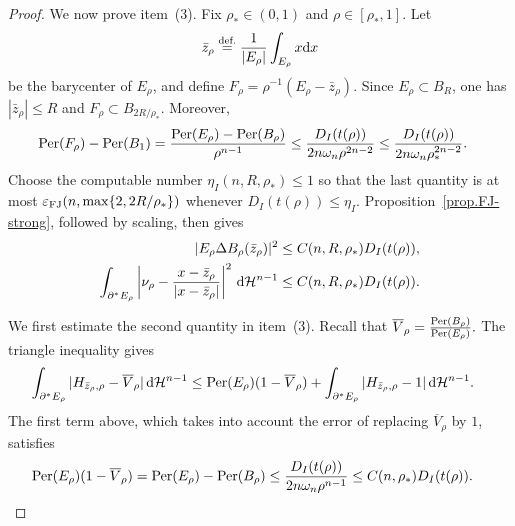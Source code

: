\documentclass[11pt]{amsart}
\theoremstyle{plain}
\theoremstyle{definition}
\newcommand{\dHn}{\,\dd\mathcal{H}^{n-1}}
\newcommand{\eqdef}{\overset{\text{def.}}{=}}
\def\dd{{\rm d}}
\newcommand\Per{\mathop{\rm Per}}
\begin{document}
\begin{proof}
We now prove item~(3). Fix $\rho_*\in(0,1)$ and
$\rho\in[\rho_*,1]$. Let
\[
 \bar z_\rho\eqdef\frac{1}{|E_\rho|}\int_{E_\rho}x\dd x
\]
be the barycenter of $E_\rho$, and define
$F_\rho=\rho^{-1}(E_\rho-\bar z_\rho)$. Since
$E_\rho\subset B_R$, one has $|\bar z_\rho|\le R$ and
$F_\rho\subset B_{2R/\rho_*}$. Moreover,
\begin{align}\label{eq.normalized_perimeter_deficit}
 \Per(F_\rho)-\Per(B_1)
 &=\frac{\Per(E_\rho)-\Per(B_\rho)}{\rho^{n-1}}
  \le\frac{D_I(t(\rho))}{2n\omega_n\rho^{2n-2}}
 \le\frac{D_I(t(\rho))}{2n\omega_n\rho_*^{2n-2}}.
\end{align}
Choose the computable number $\eta_I(n,R,\rho_*)\le1$ so that the last
quantity is at most
$\varepsilon_{\rm FJ}(n,\max\{2,2R/\rho_*\})$ whenever
$D_I(t(\rho))\le\eta_I$. Proposition~\ref{prop.FJ-strong}, followed by
scaling, then gives
\begin{align}
 |E_\rho\Delta B_\rho(\bar z_\rho)|^2
 &\le C(n,R,\rho_*)D_I(t(\rho)),
 \label{eq.local_FJ_volume}\\
 \int_{\partial^*E_\rho}
 \left|\nu_\rho-\frac{x-\bar z_\rho}{|x-\bar z_\rho|}\right|^2\dHn
 &\le C(n,R,\rho_*)D_I(t(\rho)).
 \label{eq.local_FJ_normal}
\end{align}

We first estimate the second quantity in item~(3). Recall that
$
 \overline V_\rho=\frac{\Per(B_\rho)}{\Per(E_\rho)}.
$
The triangle inequality gives
\begin{align*}
 \int_{\partial^*E_\rho}
 |H_{\bar z_\rho,\rho}-\overline V_\rho|\dHn
 &\le \Per(E_\rho)(1-\overline V_\rho)
 +\int_{\partial^*E_\rho}|H_{\bar z_\rho,\rho}-1|\dHn.
\end{align*}
The first term above, which takes into account the error of replacing
$\overline V_\rho$ by $1$, satisfies
\begin{align*}
 \Per(E_\rho)(1-\overline V_\rho)
 &=\Per(E_\rho)-\Per(B_\rho)
 \le\frac{D_I(t(\rho))}{2n\omega_n\rho^{n-1}}
 \le C(n,\rho_*)D_I(t(\rho)).
\end{align*}


\end{proof}
\end{document}
